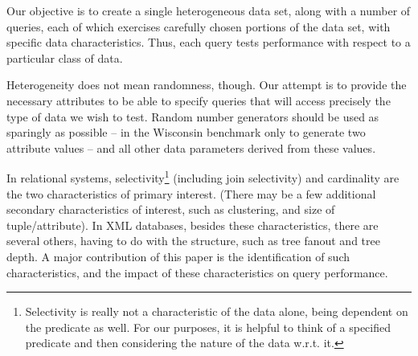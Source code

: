 Our objective is to create a single heterogeneous data set, along with
a number of queries, each of which exercises carefully chosen portions
of the data set, with specific data characteristics.  Thus, each query
tests performance with respect to a particular class of data.

Heterogeneity does not mean randomness, though.  Our attempt is to
provide the necessary attributes to be able to specify queries that
will access precisely the type of data we wish to test.  Random number
generators should be used as sparingly as possible -- in the Wisconsin
benchmark only to generate two attribute values -- and all other data
parameters derived from these values.

In relational systems, selectivity\footnote{Selectivity is really not
a characteristic of the data alone, being dependent on the predicate
as well.  For our purposes, it is helpful to think of a specified
predicate and then considering the nature of the data w.r.t. it.}
(including join selectivity) and cardinality are the two
characteristics of primary interest.  (There may be a few additional
secondary characteristics of interest, such as clustering, and size of
tuple/attribute).  In XML databases, besides these characteristics,
there are several others, having to do with the structure, such as
tree fanout and tree depth. A major contribution of this paper is the
identification of such characteristics, and the impact of these
characteristics on query performance.